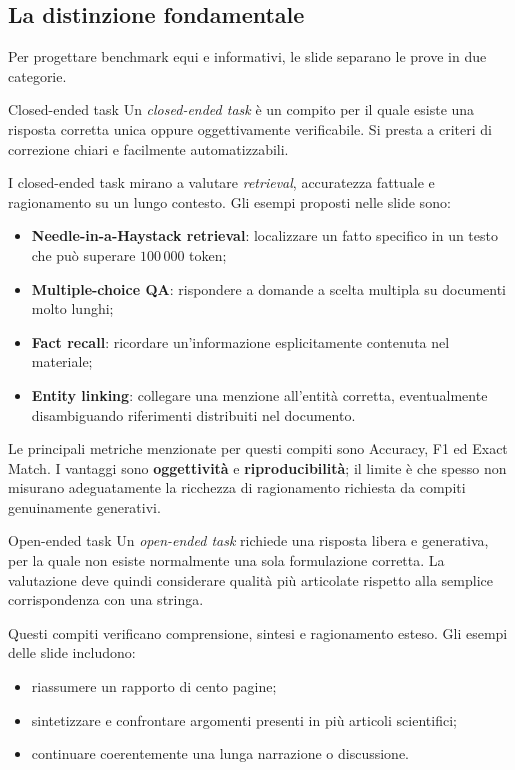 \subsection{La distinzione fondamentale}

Per progettare benchmark equi e informativi, le slide separano le prove in due categorie.

\begin{definition}{Closed-ended task}
Un \emph{closed-ended task} è un compito per il quale esiste una risposta corretta unica oppure oggettivamente verificabile. Si presta a criteri di correzione chiari e facilmente automatizzabili.
\end{definition}

I closed-ended task mirano a valutare \emph{retrieval}, accuratezza fattuale e ragionamento su un lungo contesto. Gli esempi proposti nelle slide sono:
\begin{itemize}
\item \textbf{Needle-in-a-Haystack retrieval}: localizzare un fatto specifico in un testo che può superare $100\,000$ token;
\item \textbf{Multiple-choice QA}: rispondere a domande a scelta multipla su documenti molto lunghi;
\item \textbf{Fact recall}: ricordare un'informazione esplicitamente contenuta nel materiale;
\item \textbf{Entity linking}: collegare una menzione all'entità corretta, eventualmente disambiguando riferimenti distribuiti nel documento.
\end{itemize}

Le principali metriche menzionate per questi compiti sono Accuracy, F1 ed Exact Match. I vantaggi sono \textbf{oggettività} e \textbf{riproducibilità}; il limite è che spesso non misurano adeguatamente la ricchezza di ragionamento richiesta da compiti genuinamente generativi.

\begin{definition}{Open-ended task}
Un \emph{open-ended task} richiede una risposta libera e generativa, per la quale non esiste normalmente una sola formulazione corretta. La valutazione deve quindi considerare qualità più articolate rispetto alla semplice corrispondenza con una stringa.
\end{definition}

Questi compiti verificano comprensione, sintesi e ragionamento esteso. Gli esempi delle slide includono:
\begin{itemize}
\item riassumere un rapporto di cento pagine;
\item sintetizzare e confrontare argomenti presenti in più articoli scientifici;
\item continuare coerentemente una lunga narrazione o discussione.
\end{itemize}

